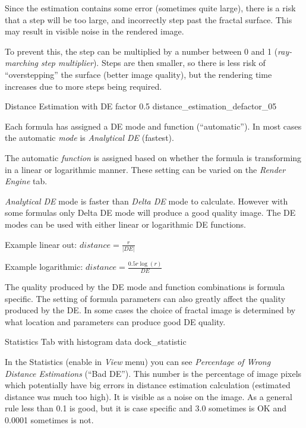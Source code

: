 Since the estimation contains some error (sometimes quite large), there is a risk that a step will be too large, and incorrectly step past the fractal surface. This may result in visible noise in the rendered image.

To prevent this, the step can be multiplied by a number between 0 and 1 (\emph{ray-marching step multiplier}). Steps are then smaller, so there is less risk of ``overstepping'' the surface (better image quality), but the rendering time increases due to more steps being required.

\nopagebreak

{Distance Estimation with DE factor 0.5}
{distance_estimation_defactor_05}

Each formula has assigned a DE mode and function (``automatic''). In most cases
the automatic \emph{mode} is \emph{Analytical DE} (fastest).

The automatic \emph{function} is assigned based on whether the formula is
transforming in a linear or logarithmic manner. These setting can be varied on
the \emph{Render Engine} tab.

\emph{Analytical DE} mode is faster than \emph{Delta DE} mode to calculate.
However with some formulas only Delta DE mode will produce a good quality image.
The DE modes can be used with either linear or logarithmic DE functions.

Example linear out: $ distance = \frac{r}{\lvert DE \rvert} $

Example logarithmic: $ distance = \frac{0.5 r  \log(r)}{DE} $

The quality produced by the DE mode and function combinations is formula
specific. The setting of formula parameters can also greatly affect the quality
produced by the DE. In some cases the choice of fractal image is determined by
what location and parameters can produce good DE quality.

\nopagebreak

{Statistics Tab with histogram data}
{dock_statistic}

In the Statistics (enable in \emph{View} menu) you can see \emph{Percentage of
	Wrong Distance Estimations} (``Bad DE''). This number is the percentage of image
pixels which potentially have big errors in distance estimation calculation
(estimated distance was much too high). It is visible as a noise on the image.
As a general rule less than 0.1 is good, but it is case specific and 3.0
sometimes is OK and 0.0001 sometimes is not.

